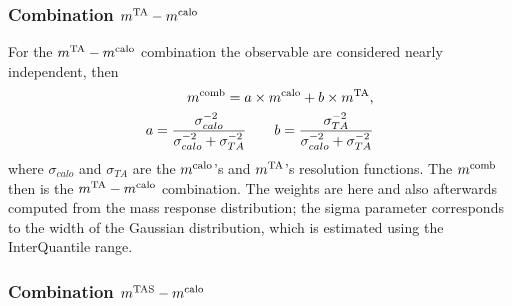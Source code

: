 

\subsubsection{Combination $m^\textrm{TA}-m^\textrm{calo}$ }

For the $m^\textrm{TA}-m^\textrm{calo}$ combination the observable are considered nearly independent, then
\begin{equation}\begin{split}
 m^\textrm{comb}= a\times m^\textrm{calo} + b \times m^\textrm{TA},\\
 a=\frac{\sigma_{calo}^{-2}}{\sigma_{calo}^{-2}+\sigma_{TA}^{-2}} \qquad b=\frac{\sigma_{TA}^{-2}}{\sigma_{calo}^{-2}+\sigma_{TA}^{-2}}
\end{split}
\label{eq:mtacomb}
\end{equation}
where $\sigma_{calo}$ and $\sigma_{TA}$ are the $m^\textrm{calo}$'s and $m^\textrm{TA}$'s resolution functions. The $m^\textrm{comb}$ then is the $m^\textrm{TA}-m^\textrm{calo}$ combination.
The weights are here and also afterwards computed from the mass response distribution; the sigma parameter corresponds to the width of the Gaussian distribution, which is estimated using the InterQuantile range. 

\subsubsection{Combination $m^\textrm{TAS}-m^\textrm{calo}$ }

